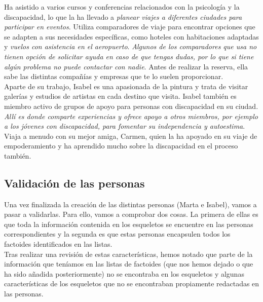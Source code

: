 Ha asistido a varios cursos y conferencias relacionados con la psicología y la discapacidad, lo que la ha llevado a 
\textit{planear viajes a diferentes ciudades para participar en eventos}. Utiliza comparadores de viaje para encontrar opciones 
que se adapten a sus necesidades específicas, como hoteles con habitaciones adaptadas y \textit{vuelos con asistencia en el 
aeropuerto}. \textit{Algunos de los comparadores que usa no tienen opción de solicitar ayuda en caso de que tengas dudas, por lo que si
tiene algún problema no puede contactar con nadie}. Antes de realizar la reserva, ella sabe las distintas compañías y empresas que te lo suelen proporcionar. \\

Aparte de su trabajo, Isabel es una apasionada de la pintura y trata de visitar galerías y estudios de artistas en cada 
destino que visita. Isabel también es miembro activo de grupos de apoyo para personas con discapacidad en su ciudad. \textit{Allí 
es donde comparte experiencias y ofrece apoyo a otros miembros, por ejemplo a los jóvenes con discapacidad, para fomentar 
su independencia y autoestima}. Viaja a menudo con su mejor amiga, Carmen, quien la ha apoyado en su viaje de empoderamiento 
y ha aprendido mucho sobre la discapacidad en el proceso también.

\subsection{Validación de las personas}
Una vez finalizada la creación de las distintas personas (Marta e Isabel), vamos a pasar a validarlas. Para ello, vamos a comprobar dos cosas. La primera
de ellas es que toda la información contenida en los esqueletos se encuentre en las personas correspondientes y la segunda es que estas personas encapsulen
todos los factoides identificados en las listas. \\

Tras realizar una revisión de estas características, hemos notado que parte de la información que teníamos en las listas de factoides (que nos hemos dejado
o que ha sido añadida posteriormente) no se encontraba en los esqueletos y algunas características de los esqueletos que no se encontraban propiamente
redactadas en las personas. \\

